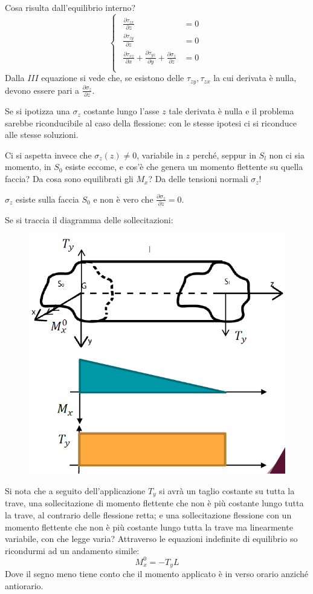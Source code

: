 		Cosa risulta dall'equilibrio interno?
		\[
		\begin{cases}
			\begin{aligned}
				\frac{\partial \tau_{zx}}{\partial z} & =0 \\
				
				\frac{\partial \tau_{zy}}{\partial z} & =0 \\
				
				\frac{\partial \tau_{xz}}{\partial x} + \frac{\partial \tau_{yz}}{\partial y} + \frac{\partial\sigma_z}{\partial z} & =0 \\
			\end{aligned}
		\end{cases}
		\]
		Dalla $III$ equazione si vede che, se esistono delle $\tau_{zy}, \tau_{zx}$ la cui derivata è nulla, devono essere pari a \(\frac{\partial\sigma_z}{\partial z}\).
		
		Se si ipotizza una $\sigma_z$ costante lungo l'asse $z$ tale derivata è nulla e il problema sarebbe riconducibile al caso della flessione: con le stesse ipotesi ci si riconduce alle stesse soluzioni. 
		
		Ci si aspetta invece che $\sigma_z(z)\neq0$, variabile in $z$ perché, seppur in $S_l$ non ci sia momento, in $S_0$ esiste eccome, e cos'è che genera un momento flettente su quella faccia? Da cosa sono equilibrati gli $M_x$? Da delle tensioni normali $\sigma_z$!
		
		$\sigma_z$ esiste sulla faccia $S_0$ e non è vero che \(\frac{\partial\sigma_z}{\partial z} = 0\). \newpage
		
		Se si traccia il diagramma delle sollecitazioni:
		
		
\begin{figure}[H]
	\centering
	\includegraphics[width=0.5\linewidth]{immagini_6/screenshot002}
	\label{fig:screenshot002}
\end{figure}

		Si nota che a seguito dell'applicazione $T_y$ si avrà un taglio costante su tutta la trave, una sollecitazione di momento flettente che non è più costante lungo tutta la trave, al contrario delle flessione retta; e una sollecitazione flessione con un momento flettente che non è più costante lungo tutta la trave ma linearmente variabile, con che legge varia? Attraverso le equazioni indefinite di equilibrio so ricondurmi ad un andamento simile:
		\[M^0_x=-T_yL\]
		Dove il segno meno tiene conto che il momento applicato è in verso orario anziché antiorario. \newline 
		
